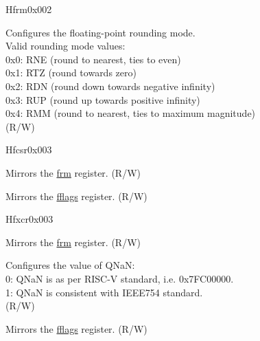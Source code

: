 \begin{register}{H}{frm}{0x002}\label{regdesc:FRM}
%
%
\regnewline%
\begin{regdesc}\begin{reglist}
\label{fielddesc:FRM}\item [FRM] Configures the floating-point rounding mode.\\
Valid rounding mode values:\\
0x0: RNE (round to nearest, ties to even)\\
0x1: RTZ (round towards zero)\\
0x2: RDN (round down towards negative infinity)\\
0x3: RUP (round up towards positive infinity)\\
0x4: RMM (round to nearest, ties to maximum magnitude)\\
(R/W)
\end{reglist}\end{regdesc}
\end{register}

\begin{register}{H}{fcsr}{0x003}\label{regdesc:FCSR}
%
%
%
\regnewline%
\begin{regdesc}\begin{reglist}
\label{fielddesc:FCSR_FRM}\item [FRM] Mirrors the \hyperref[regdesc:FRM]{frm} register. (R/W)
\label{fielddesc:FCSR_FFLAGS}\item [FFLAGS] Mirrors the \hyperref[regdesc:FFLAGS]{fflags} register. (R/W)
\end{reglist}\end{regdesc}
\end{register}

\begin{register}{H}{fxcr}{0x003}\label{regdesc:FXCR}
%
%
%
%
%
\regnewline%
\begin{regdesc}\begin{reglist}
\label{fielddesc:FXCR_FRM}\item [FRM] Mirrors the \hyperref[regdesc:FRM]{frm} register. (R/W)
\label{fielddesc:FXCR_DQNaN}\item [DQNaN] Configures the value of QNaN: \\
0: QNaN is as per RISC-V standard, i.e. 0x7FC00000.\\
1: QNaN is consistent with IEEE754 standard.\\
(R/W)
\label{fielddesc:FXCR_FFLAGS}\item [FFLAGS] Mirrors the \hyperref[regdesc:FFLAGS]{fflags} register. (R/W)
\end{reglist}\end{regdesc}
\end{register}


